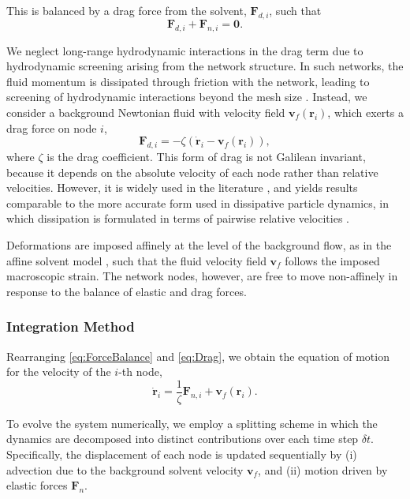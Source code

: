 This is balanced by a drag force from the solvent, $\bm{F}_{d,i}$, such that
\begin{equation}
    \bm{F}_{d,i} + \bm{F}_{n,i}=\bm{0}.
    \label{eq:ForceBalance}
\end{equation}

We neglect long-range hydrodynamic interactions in the drag term due to hydrodynamic screening arising from the network structure. In such networks, the fluid momentum is dissipated through friction with the network, leading to screening of hydrodynamic interactions beyond the mesh size \cite{shankar_theory_2002,visscher_dynamic_1994}. Instead, we consider a background Newtonian fluid with velocity field $\bm{v}_f(\bm{r}_i)$, which exerts a drag force on node $i$,
\begin{equation}
    \bm{F}_{d,i} = -\zeta\left(\dot{\bm{r}}_i - \bm{v}_f(\bm{r}_i)\right),
    \label{eq:Drag}
\end{equation}
where $\zeta$ is the drag coefficient. This form of drag is not Galilean invariant, because it depends on the absolute velocity of each node rather than relative velocities. However, it is widely used in the literature \cite{gittes_dynamic_1998,broedersz_modeling_2014,ikeda_unified_2012,puosi_time-dependent_2014,durian_foam_1995,salerno_avalanches_2012,liuDrivingRateDependence2016}, and yields results comparable to the more accurate form used in dissipative particle dynamics, in which dissipation is formulated in terms of pairwise relative velocities \cite{groot_dissipative_1997}. 

Deformations are imposed affinely at the level of the background flow, as in the affine solvent model \cite{durian_foam_1995,lerner_simulations_2013}, such that the fluid velocity field $\bm{v}_f$ follows the imposed macroscopic strain. The network nodes, however, are free to move non-affinely in response to the balance of elastic and drag forces.

\subsubsection{Integration Method} \label{sec:EulerHeun}
Rearranging \cref{eq:ForceBalance} and \cref{eq:Drag}, we obtain the equation of motion for the velocity of the $i$-th node,
\begin{equation*}
    \dot{\bm{r}}_i = \frac{1}{\zeta}\bm{F}_{n,i} + \bm{v}_f(\bm{r}_i).
\end{equation*}

To evolve the system numerically, we employ a splitting scheme in which the dynamics are decomposed into distinct contributions over each time step $\delta t$. Specifically, the displacement of each node is updated sequentially by (i) advection due to the background solvent velocity $\bm{v}_f$, and (ii) motion driven by elastic forces $\bm{F}_n$.

